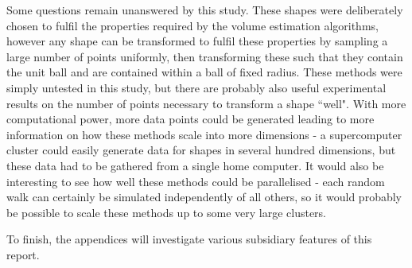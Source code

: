 Some questions remain unanswered by this study. These shapes were deliberately chosen to fulfil the properties required by the volume estimation algorithms, however any shape can be transformed to fulfil these properties by sampling a large number of points uniformly, then transforming these such that they contain the unit ball and are contained within a ball of fixed radius. These methods were simply untested in this study, but there are probably also useful experimental results on the number of points necessary to transform a shape ``well". With more computational power, more data points could be generated leading to more information on how these methods scale into more dimensions - a supercomputer cluster could easily generate data for shapes in several hundred dimensions, but these data had to be gathered from a single home computer. It would also be interesting to see how well these methods could be parallelised - each random walk can certainly be simulated independently of all others, so it would probably be possible to scale these methods up to some very large clusters.

To finish, the appendices will investigate various subsidiary features of this report.